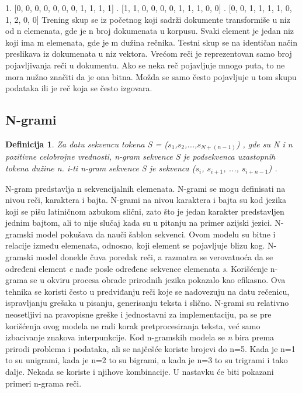 \documentclass[12pt,oneside]{memoir}
\begin{document}
\begin{enumerate}
{{    	1.  [0, 0, 0, 0, 0, 0, 0, 1, 1, 1, 1] .  [1, 1, 0, 0, 0, 0, 1, 1, 1, 0, 0] . [0, 0, 1, 1, 1, 1, 0, 1, 2, 0, 0]
    }
}
\newline
\newline
Trening skup se iz početnog koji sadrži dokumente transformiše u niz od n elemenata, gde je n broj dokumenata u korpusu.  Svaki element je jedan niz koji ima m elemenata, gde je m dužina rečnika.  Testni skup se na identičan način preslikava iz dokumenata u niz vektora.  
Vrećom reči je reprezentovan samo broj pojavljivanja reči u dokumentu.  
\newpage
\noindent
Ako se neka reč pojavljuje mnogo puta, to ne mora nužno značiti da je ona bitna.  Možda se samo često pojavljuje u tom skupu podataka ili je reč koja se često izgovara.
\end{enumerate}

\subsection{N-grami}

\newtheorem{mydef}{Definicija}
\begin{mydef}
Za datu sekvencu tokena S = \normalfont($s_1$,$s_2$,...,$s_{N+(n-1)}$\normalfont) , gde su N i n pozitivne celobrojne vrednosti,  n-gram sekvence S je podsekvenca uzastopnih tokena dužine n.  i-ti n-gram sekvence S je sekvenca ($s_i$, $s_{i+1}$, ..., $s_{i+n-1}$) \cite{ngram}.
\end{mydef}

N-gram predstavlja n sekvencijalnih elemenata.  N-grami se mogu definisati na nivou reči, karaktera i bajta.  N-grami na nivou karaktera i bajta su kod jezika koji se pišu latiničnom azbukom slični, zato što je jedan karakter predstavljen jednim bajtom, ali to nije slučaj kada su u pitanju na primer azijski jezici.  N-gramski model pokušava da nauči šablon sekvenci.  Ovom modelu su bitne i relacije između elemenata, odnosno, koji element se pojavljuje blizu kog.  N-gramski model donekle čuva poredak reči, a razmatra se verovatnoća da se određeni element \textit{e} nađe posle određene sekvence elemenata \textit{s}. 
Korišćenje n-grama se u okviru procesa obrade prirodnih jezika pokazalo kao efikasno.  Ova tehnika se koristi često u predviđanju reči koje se nadovezuju na datu rečenicu, ispravljanju grešaka u pisanju, generisanju teksta i slično.  
N-grami su relativno neosetljivi na pravopisne greške i jednostavni za implementaciju, pa se pre korišćenja ovog modela ne radi korak pretprocesiranja teksta, već samo izbacivanje znakova interpunkcije.  
Kod n-gramskih modela se \textit{n} bira prema prirodi problema i podataka,  ali se najčešće koriste brojevi do n=5.  Kada je n=1 to su unigrami, kada je n=2 to su bigrami,  a kada je n=3 to su trigrami i tako dalje.  Nekada se koriste i njihove kombinacije. 
U nastavku će biti pokazani primeri n-grama reči.
\end{document}
